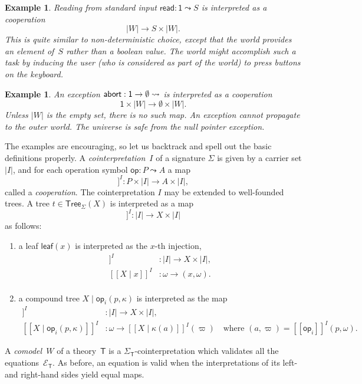 \documentclass{amsart}
\newcommand{\theory}[1]{\mathsf{#1}} %
\newcommand{\signature}[1]{\Sigma_{\theory{#1}}} %
\newcommand{\equations}[1]{\mathcal{E}_{\theory{#1}}} %
\newcommand{\carrier}[1]{|#1|} %
\newcommand{\Tree}[2]{\mathsf{Tree}_{#1}(#2)} %
\newcommand{\leaf}[1]{\mathsf{leaf}(#1)} %
\newcommand{\op}[1]{\mathsf{op}_{#1}} %
\newcommand{\opdecl}[3]{#1 : #2 \leadsto #3} %
\newcommand{\one}{\mathsf{1}} %
\newcommand{\sem}[1]{[\![#1]\!]} %
\newcommand{\kode}[1]{\mathsf{#1}}
\newtheorem{example}[definition]{Example}
\begin{document}
\begin{example}
  Reading from standard input $\opdecl{\kode{read}}{\one}{S}$ is interpreted as
  a cooperation
  \begin{equation*}
    |W| \to S \times |W|.
  \end{equation*}
  This is quite similar to non-deterministic choice, except that the world
  provides an element of~$S$ rather than a boolean value. The world might
  accomplish such a task by inducing the user (who is considered as part of the
  world) to press buttons on the keyboard.
\end{example}

\begin{example}
  An exception $\opdecl{\kode{abort}}{\one \to \emptyset}$ is interpreted as a
  cooperation
  \begin{equation*}
    \one \times |W| \to \emptyset \times |W|.
  \end{equation*}
  Unless $|W|$ is the empty set, there is no such map. An exception cannot
  propagate to the outer world. The universe is safe from the null pointer exception.
\end{example}

The examples are encouraging, so let us backtrack and spell out the basic
definitions properly. A \emph{cointerpretation}~$I$ of a signature $\Sigma$ is
given by a carrier set $\carrier{I}$, and for each operation symbol $\opdecl{\kode{op}}{P}{A}$
a map
%
\begin{equation*}
  \sem{\kode{op}}^I : P \times \carrier{I} \to A \times \carrier{I},
\end{equation*}
%
called a \emph{cooperation}. The cointerpretation $I$ may be extended to
well-founded trees. A tree $t \in \Tree{\Sigma}{X}$ is interpreted as a map
%
\begin{equation*}
  \sem{t}^I : \carrier{I} \to X \times \carrier{I}
\end{equation*}
%
as follows:
%
\begin{enumerate}
\item a leaf $\leaf{x}$ is interpreted as the $x$-th injection,
  \begin{align*}
    \sem{X \mid x}^I &: \carrier{I} \to X \times \carrier{I},\\
    \sem{X \mid x}^I &: \omega \to (x, \omega).\\
  \end{align*}
\item a compound tree $X \mid \op{i}(p, \kappa)$ is interpreted as the map
  \begin{align*}
    \sem{X \mid \op{i}(p, \kappa)}^I &: \carrier{I} \to X \times \carrier{I},\\
    \sem{X \mid \op{i}(p, \kappa)}^I &: \omega \to
         \sem{X \mid \kappa(a)}^I(\varpi)
         \quad\text{where $(a, \varpi) = \sem{\op{i}}^{I}(p, \omega)$.}
  \end{align*}
\end{enumerate}
%
A \emph{comodel~$W$} of a theory~$\theory{T}$ is a
$\signature{T}$-cointerpretation which validates all the
equations~$\equations{T}$. As before, an equation is valid when the
interpretations of its left- and right-hand sides yield equal maps.
\end{document}
